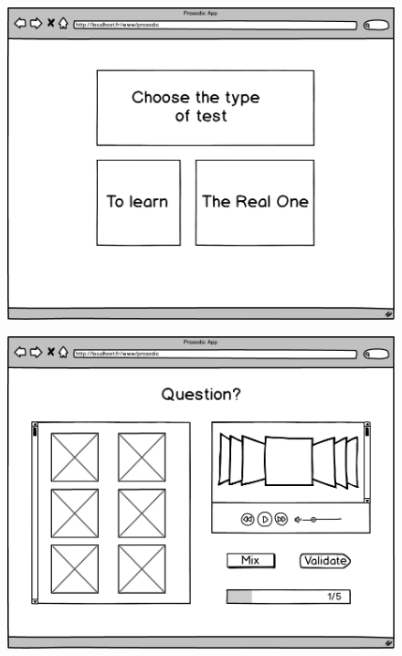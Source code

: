 \documentclass[a4paper,twoside,10pt]{report}
\begin{document}
 \begin{figure}[ht]
  \includegraphics[width=\textwidth]{1.png}
 \end{figure}
 
 \begin{figure}[ht]
  \includegraphics[width=\textwidth]{F-1.png}
 \end{figure}
 
\end{document}

